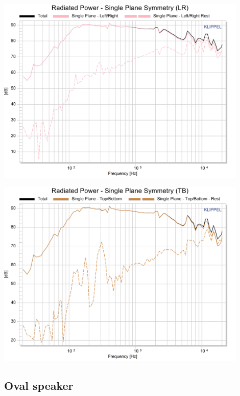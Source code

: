 \documentclass{report}
\begin{document}
\begin{appendices}
\begin{minipage}{0.5\textwidth}
\begin{center}
	\includegraphics[width=0.9\textwidth]{Sym/10cm_RadPow_SpsLR}
    \captionsetup{hypcap=false}
\end{center}
\end{minipage}
\begin{minipage}{0.5\textwidth}
\begin{center}
	\includegraphics[width=0.9\textwidth]{Sym/10cm_RadPow_SpsTB}
    \captionsetup{hypcap=false}
\end{center}
\end{minipage}

\subsection{Oval speaker}
\label{Curves:oval}


\end{appendices}
\end{document}
